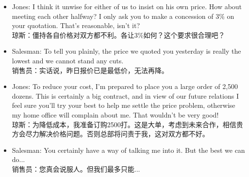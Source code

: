 \begin{frame}[allowframebreaks]
\begin{itemize}
    \item Jones: I think it unwise for either of us to insist on his own price. How about meeting each other halfway? I only ask you to make a concession of 3\% on your quotation. That’s reasonable, isn’t it? \\
    \small{琼斯：僵持各自价格对双方都不利。各让3\%如何？这个要求很合理吧？}
    
    \item Salesman: To tell you plainly, the price we quoted you yesterday is really the lowest and we cannot stand any cuts. \\
    \small{销售员：实话说，昨日报价已是最低价，无法再降。}
    
    \item Jones: To reduce your cost, I’m prepared to place you a large order of 2,500 dozens. This is certainly a big contract, and in view of our future relations I feel sure you’ll try your best to help me settle the price problem, otherwise my home office will complain about me. That wouldn’t be very good! \\
    \small{琼斯：为降低成本，我准备订购2500打。这是大单，考虑到未来合作，相信贵方会尽力解决价格问题。否则总部将问责于我，这对双方都不好。}
    
    \item Salesman: You certainly have a way of talking me into it. But the best we can do... \\
    \small{销售员：您真会说服人。但我们最多只能...}
    \end{itemize}
    \end{frame}
    